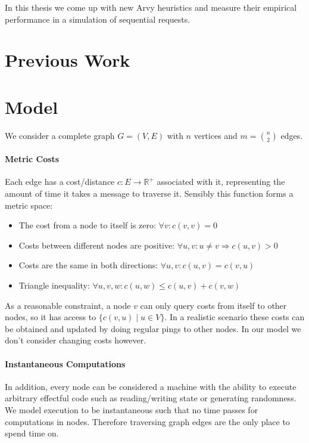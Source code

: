 \documentclass[a4paper, oneside]{discothesis}
\begin{document}
In this thesis we come up with new Arvy heuristics and measure their empirical performance in a simulation of sequential requests.

\section{Previous Work}

\TODO{}

\newpage
\section{Model}
\label{model}

We consider a complete graph $G=(V,E)$ with $n$ vertices and $m=\binom{n}{2}$ edges.

\paragraph{Metric Costs} Each edge has a cost/distance $c : E \rightarrow \mathbb{R}^+$ associated with it, representing the amount of time it takes a message to traverse it. Sensibly this function forms a metric space:
\begin{itemize}
\item The cost from a node to itself is zero: $\forall v:c(v, v)=0$
\item Costs between different nodes are positive: $\forall u,v : u\neq v\Rightarrow c(u,v)>0$
\item Costs are the same in both directions: $\forall u,v : c(u,v)=c(v,u)$
\item Triangle inequality: $\forall u,v,w : c(u,w)\leq c(u,v)+c(v,w)$
\end{itemize}

As a reasonable constraint, a node $v$ can only query costs from itself to other nodes, so it has access to $\{c(v, u)\;|\;u\in V\}$. In a realistic scenario these costs can be obtained and updated by doing regular pings to other nodes. In our model we don't consider changing costs however.

\paragraph{Instantaneous Computations} In addition, every node can be considered a machine with the ability to execute arbitrary effectful code such as reading/writing state or generating randomness. We model execution to be instantaneous such that no time passes for computations in nodes. Therefore traversing graph edges are the only place to spend time on.
\end{document}
